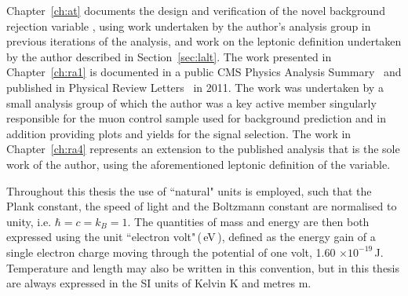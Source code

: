Chapter~\ref{ch:at} documents the design and verification of the novel background rejection variable \alt, using work undertaken by the author's analysis group in previous iterations of the analysis, and work on the leptonic definition undertaken by the author described in Section~\ref{sec:lalt}. The work presented in Chapter~\ref{ch:ra1} is documented in a public CMS Physics Analysis Summary~\cite{1fbnote} and published in Physical Review Letters~\cite{PRL1fb} in 2011. The work was undertaken by a small analysis group of which the author was a key active member singularly responsible for the muon control sample used for background prediction and in addition providing plots and yields for the signal selection. The work in Chapter~\ref{ch:ra4} represents an extension to the published analysis that is the sole work of the author, using the aforementioned leptonic definition of the \alt variable. 

Throughout this thesis the use of ``natural" units is employed, such that the Plank constant, the speed of light and the Boltzmann constant are normalised to unity, i.e. $\hbar = c =  k_{B} = 1$. The quantities of mass and energy are then both expressed using the unit ``electron volt"\,(\,eV\,), defined as the energy gain of a single electron charge moving through the potential of one volt, 1.60 $\times 10^{-19}$\,J. Temperature and length may also be written in this convention, but in this thesis are always expressed in the SI units of Kelvin K and metres m. 